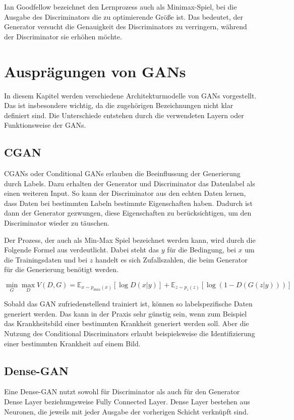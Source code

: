 Ian Goodfellow bezeichnet den Lernprozess auch als Minimax-Spiel, bei die Ausgabe des Discriminators die zu optimierende Größe ist.
Das bedeutet, der Generator versucht die Genauigkeit des Discriminators zu verringern, während der Discriminator sie erhöhen möchte. \cite{gan-minimax} 

\section{Ausprägungen von GANs}
In diesem Kapitel werden verschiedene Architekturmodelle von GANs vorgestellt.
Das ist insbesondere wichtig, da die zugehörigen Bezeichnungen nicht klar definiert sind.
Die Unterschiede entstehen durch die verwendeten Layern oder Funktionsweise der GANs.

\subsection{CGAN}
CGANs oder Conditional GANs \cite{mirza2014conditional, gan-conditional} erlauben die Beeinflussung der Generierung durch Labels.
Dazu erhalten der Generator und Discriminator das Datenlabel als einen weiteren Input.
So kann der Discriminator aus den echten Daten lernen, dass Daten bei bestimmten Labeln bestimmte Eigenschaften haben.
Dadurch ist dann der Generator gezwungen, diese Eigenschaften zu berücksichtigen, um den Discriminator wieder zu täuschen.

Der Prozess, der auch als Min-Max Spiel bezeichnet werden kann, wird durch die Folgende Formel aus \cite[S. 3]{mirza2014conditional} verdeutlicht.
Dabei steht das $y$ für die Bedingung, bei $x$ um die Trainingsdaten und bei $z$ handelt es sich Zufallszahlen, die beim Generator für die Generierung benötigt werden.

\[ \min_G \max_D V(D, G) = \mathbb{E}_{x \sim p_{data}(x)} [\log D(x|y)] + \mathbb{E}_{z \sim p_z(z)} [\log(1 - D(G(z|y)))] \]

Sobald das GAN zufriedenstellend trainiert ist, können so labelspezifische Daten generiert werden.
Das kann in der Praxis sehr günstig sein, wenn zum Beispiel das Krankheitsbild einer bestimmten Krankheit generiert werden soll.
Aber die Nutzung des Conditional Discriminators erlaubt beispielsweise die Identifizierung einer bestimmten Krankheit auf einem Bild.

\subsection{Dense-GAN}
Eine Dense-GAN nutzt sowohl für Discriminator als auch für den Generator Dense Layer beziehungsweise Fully Connected Layer.
Dense Layer bestehen aus Neuronen, die jeweils mit jeder Ausgabe der vorherigen Schicht verknüpft sind.
\newline

